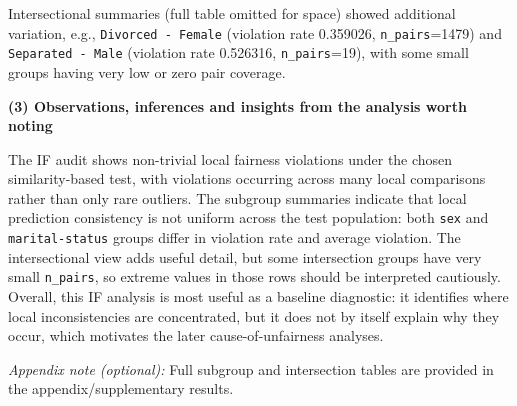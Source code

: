 \documentclass[11pt,a4paper]{article}
\begin{document}
\vspace{-0.2em}
Intersectional summaries (full table omitted for space) showed additional variation, e.g., \texttt{Divorced - Female} (violation rate 0.359026, \texttt{n\_pairs}=1479) and \texttt{Separated - Male} (violation rate 0.526316, \texttt{n\_pairs}=19), with some small groups having very low or zero pair coverage.

\textbf{(3) Observations, inferences and insights from the analysis worth noting}

The IF audit shows non-trivial local fairness violations under the chosen similarity-based test, with violations occurring across many local comparisons rather than only rare outliers. The subgroup summaries indicate that local prediction consistency is not uniform across the test population: both \texttt{sex} and \texttt{marital-status} groups differ in violation rate and average violation. The intersectional view adds useful detail, but some intersection groups have very small \texttt{n\_pairs}, so extreme values in those rows should be interpreted cautiously. Overall, this IF analysis is most useful as a baseline diagnostic: it identifies where local inconsistencies are concentrated, but it does not by itself explain why they occur, which motivates the later cause-of-unfairness analyses.

\textit{Appendix note (optional):} Full subgroup and intersection tables are provided in the appendix/supplementary results.
\end{document}
